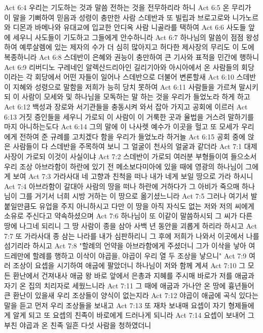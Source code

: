 Act 6:4  우리는 기도하는 것과 말씀 전하는 것을 전무하리라 하니
Act 6:5  온 무리가 이 말을 기뻐하여 믿음과 성령이 충만한 사람 스데반과 또 빌립과 브로고로와 니가노르와 디몬과 바메나와 유대교에 입교한 안디옥 사람 니골라를 택하여
Act 6:6  사도들 앞에 세우니 사도들이 기도하고 그들에게 안수하니라
Act 6:7  하나님의 말씀이 점점 왕성하여 예루살렘에 있는 제자의 수가 더 심히 많아지고 허다한 제사장의 무리도 이 도에 복종하니라
Act 6:8  스데반이 은혜와 권능이 충만하여 큰 기사와 표적을 민간에 행하니
Act 6:9  리버디노 구레네인 알렉산드리아인 길리기아와 아시아에서 온 사람들의 회당이라는 각 회당에서 어떤 자들이 일어나 스데반으로 더불어 변론할새
Act 6:10  스데반이 지혜와 성령으로 말함을 저희가 능히 당치 못하여
Act 6:11  사람들을 가르쳐 말시키되 이 사람이 모세와 및 하나님을 모독하는 말 하는 것을 우리가 들었노라 하게 하고
Act 6:12  백성과 장로와 서기관들을 충동시켜 와서 잡아 가지고 공회에 이르러
Act 6:13  거짓 증인들을 세우니 가로되 이 사람이 이 거룩한 곳과 율법을 거스려 말하기를 마지 아니하는도다
Act 6:14  그의 말에 이 나사렛 예수가 이곳을 헐고 또 모세가 우리에게 전하여 준 규례를 고치겠다 함을 우리가 들었노라 하거늘
Act 6:15  공회 중에 앉은 사람들이 다 스데반을 주목하여 보니 그 얼굴이 천사의 얼굴과 같더라
Act 7:1  대제사장이 가로되 이것이 사실이냐
Act 7:2  스데반이 가로되 여러분 부형들이여 들으소서 우리 조상 아브라함이 하란에 있기 전 메소보다미아에 있을 때에 영광의 하나님이 그에게 보여
Act 7:3  가라사대 네 고향과 친척을 떠나 내가 네게 보일 땅으로 가라 하시니
Act 7:4  아브라함이 갈대아 사람의 땅을 떠나 하란에 거하다가 그 아비가 죽으매 하나님이 그를 거기서 너희 시방 거하는 이 땅으로 옮기셨느니라
Act 7:5  그러나 여기서 발 붙일만큼도 유업을 주지 아니하시고 다만 이 땅을 아직 자식도 없는 저와 저의 씨에게 소유로 주신다고 약속하셨으며
Act 7:6  하나님이 또 이같이 말씀하시되 그 씨가 다른 땅에 나그네 되리니 그 땅 사람이 종을 삼아 사백 년 동안을 괴롭게 하리라 하시고
Act 7:7  또 가라사대 종 삼는 나라를 내가 심판하리니 그 후에 저희가 나와서 이곳에서 나를 섬기리라 하시고
Act 7:8  "할례의 언약을 아브라함에게 주셨더니 그가 이삭을 낳아 여드레만에 할례를 행하고 이삭이 야곱을, 야곱이 우리 열 두 조상을 낳으니"
Act 7:9  여러 조상이 요셉을 시기하여 애굽에 팔았더니 하나님이 저와 함께 계셔
Act 7:10  그 모든 환난에서 건져내사 애굽 왕 바로 앞에서 은총과 지혜를 주시매 바로가 저를 애굽과 자기 온 집의 치리자로 세웠느니라
Act 7:11  그 때에 애굽과 가나안 온 땅에 흉년들어 큰 환난이 있을새 우리 조상들이 양식이 없는지라
Act 7:12  야곱이 애굽에 곡식 있다는 말을 듣고 먼저 우리 조상들을 보내고
Act 7:13  또 재차 보내매 요셉이 자기 형제들에게 알게 되고 또 요셉의 친족이 바로에게 드러나게 되니라
Act 7:14  요셉이 보내어 그 부친 야곱과 온 친족 일흔 다섯 사람을 청하였더니
